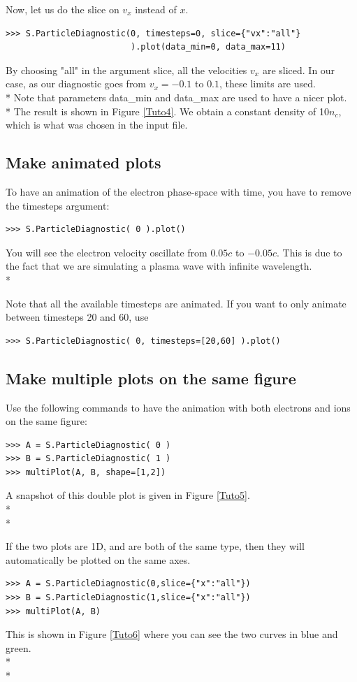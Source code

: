 \documentclass[11pt]{article}
\newcommand{\code}[1]{\colorbox{yellow!15}{\ttfamily #1}}
\begin{document}
Now, let us do the slice on $v_x$ instead of $x$.
\begin{lstlisting}
>>> S.ParticleDiagnostic(0, timesteps=0, slice={"vx":"all"}
                         ).plot(data_min=0, data_max=11)
\end{lstlisting}
By choosing \code{"all"} in the argument \code{slice}, all the velocities $v_x$ are sliced.
In our case, as our diagnostic goes from $v_x=-0.1$ to $0.1$, these limits are used.\\*
Note that parameters \code{data\_min} and \code{data\_max} are used to have a nicer plot.\\*
The result is shown in Figure \ref{Tuto4}. We obtain a constant density of 10$n_c$, which is what was chosen in the input file.

\subsection{Make animated plots}
To have an animation of the electron phase-space with time, you have to remove the \code{timesteps} argument:
\begin{lstlisting}
>>> S.ParticleDiagnostic( 0 ).plot()
\end{lstlisting}
You will see the electron velocity oscillate from $0.05c$ to $-0.05c$. This is due to the fact that we are simulating a plasma wave with infinite wavelength.\\*

Note that all the available timesteps are animated. If you want to only animate between timesteps 20 and 60, use
\begin{lstlisting}
>>> S.ParticleDiagnostic( 0, timesteps=[20,60] ).plot()
\end{lstlisting}


\subsection{Make multiple plots on the same figure}

Use the following commands to have the animation with both electrons and ions on the same figure:
\begin{lstlisting}
>>> A = S.ParticleDiagnostic( 0 )
>>> B = S.ParticleDiagnostic( 1 )
>>> multiPlot(A, B, shape=[1,2])
\end{lstlisting}
A snapshot of this double plot is given in Figure \ref{Tuto5}.\\*\\*

If the two plots are 1D, and are both of the same type, then they will automatically be plotted on the same axes.
\begin{lstlisting}
>>> A = S.ParticleDiagnostic(0,slice={"x":"all"})
>>> B = S.ParticleDiagnostic(1,slice={"x":"all"})
>>> multiPlot(A, B)
\end{lstlisting}
This is shown in Figure \ref{Tuto6} where you can see the two curves in blue and green.\\*\\*
\end{document}
